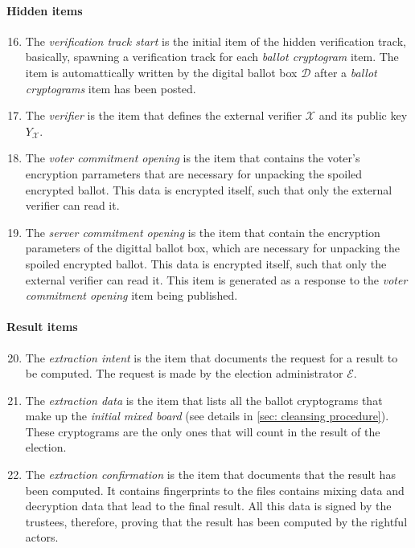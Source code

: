 \paragraph{Hidden items}
\begin{enumerate}
    \setcounter{enumi}{15}
    \item The \textit{verification track start} is the initial item of the hidden verification track, basically, spawning a verification track for each \textit{ballot cryptogram} item. The item is automattically written by the digital ballot box $\mathcal{D}$ after a \textit{ballot cryptograms} item has been posted.
    
    \item The \textit{verifier} is the item that defines the external verifier $\mathcal{X}$ and its public key $Y_\mathcal{X}$.

    \item The \textit{voter commitment opening} is the item that contains the voter's encryption parrameters that are necessary for unpacking the spoiled encrypted ballot. This data is encrypted itself, such that only the external verifier can read it.
    
    \item The \textit{server commitment opening} is the item that contain the encryption parameters of the digittal ballot box, which are necessary for unpacking the spoiled encrypted ballot. This data is encrypted itself, such that only the external verifier can read it. This item is generated as a response to the \textit{voter commitment opening} item being published.
\end{enumerate}

\paragraph{Result items}
\begin{enumerate}
    \setcounter{enumi}{19}
    \item The \textit{extraction intent} is the item that documents the request for a result to be computed. The request is made by the election administrator $\mathcal{E}$.
    
    \item The \textit{extraction data} is the item that lists all the ballot cryptograms that make up the \textit{initial mixed board} (see details in \cref{sec: cleansing procedure}). These cryptograms are the only ones that will count in the result of the election.

    \item The \textit{extraction confirmation} is the item that documents that the result has been computed. It contains fingerprints to the files contains mixing data and decryption data that lead to the final result. All this data is signed by the trustees, therefore, proving that the result has been computed by the rightful actors.
\end{enumerate}
